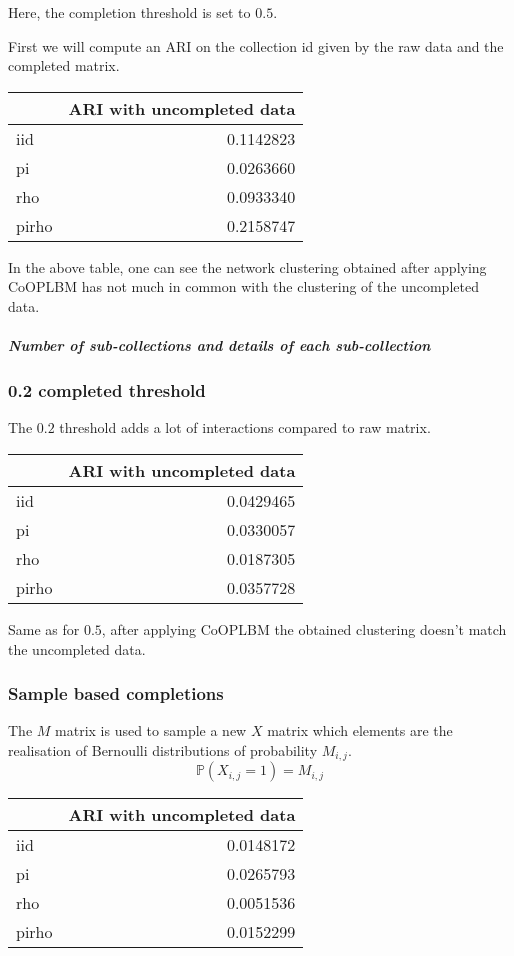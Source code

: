 Here, the completion threshold is set to \(0.5\).

First we will compute an ARI on the collection id given by the raw data
and the completed matrix.

\begin{longtable}[]{@{}lr@{}}
\toprule
& ARI with uncompleted data\tabularnewline
\midrule
\endhead
iid & 0.1142823\tabularnewline
pi & 0.0263660\tabularnewline
rho & 0.0933340\tabularnewline
pirho & 0.2158747\tabularnewline
\bottomrule
\end{longtable}

In the above table, one can see the network clustering obtained after
applying CoOPLBM has not much in common with the clustering of the
uncompleted data.

\hypertarget{number-of-sub-collections-and-details-of-each-sub-collection}{%
\subparagraph{Number of sub-collections and details of each
sub-collection}\label{number-of-sub-collections-and-details-of-each-sub-collection}}

\hypertarget{completed-threshold-1}{%
\subsubsection{0.2 completed threshold}\label{completed-threshold-1}}

The \(0.2\) threshold adds a lot of interactions compared to raw matrix.

\begin{longtable}[]{@{}lr@{}}
\toprule
& ARI with uncompleted data\tabularnewline
\midrule
\endhead
iid & 0.0429465\tabularnewline
pi & 0.0330057\tabularnewline
rho & 0.0187305\tabularnewline
pirho & 0.0357728\tabularnewline
\bottomrule
\end{longtable}

Same as for \(0.5\), after applying CoOPLBM the obtained clustering
doesn't match the uncompleted data.

\hypertarget{sample-based-completions}{%
\subsubsection{Sample based
completions}\label{sample-based-completions}}

The \(M\) matrix is used to sample a new \(X\) matrix which elements are
the realisation of Bernoulli distributions of probability \(M_{i,j}\).
\[\mathbb{P}(X_{i,j} = 1) = M_{i,j} \]

\begin{longtable}[]{@{}lr@{}}
\toprule
& ARI with uncompleted data\tabularnewline
\midrule
\endhead
iid & 0.0148172\tabularnewline
pi & 0.0265793\tabularnewline
rho & 0.0051536\tabularnewline
pirho & 0.0152299\tabularnewline
\bottomrule
\end{longtable}
